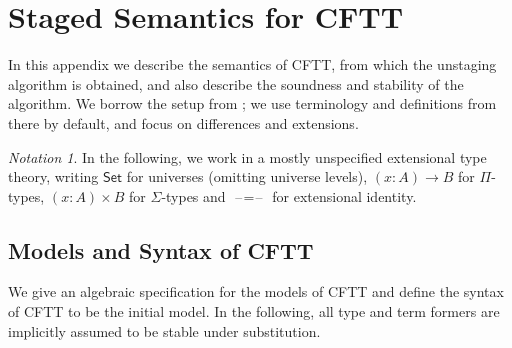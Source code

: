 \documentclass[acmsmall,screen]{acmart}
\newcommand{\msf}[1]{{\mathsf{#1}}}
\newcommand{\Set}{\msf{Set}}
\newcommand{\blank}{{\mathord{\hspace{1pt}\text{--}\hspace{1pt}}}}
\theoremstyle{remark}
\newtheorem{notation}{Notation}
\begin{document}
\newpage

\appendices
\section{Staged Semantics for CFTT}\label{appendix:A}

In this appendix we describe the semantics of CFTT, from which the unstaging
algorithm is obtained, and also describe the soundness and stability of the
algorithm. We borrow the setup from \cite{staged2ltt}; we use terminology and
definitions from there by default, and focus on differences and extensions.

\begin{notation} In the following, we work in a mostly unspecified extensional
type theory, writing $\Set$ for universes (omitting universe levels), $(x : A) \to B$
for $\Pi$-types, $(x : A) \times B$ for $\Sigma$-types and $\blank\!=\!\blank$ for
extensional identity.

\end{notation}

\subsection{Models and Syntax of CFTT}

We give an algebraic \cite{cartmellthesis,DBLP:journals/corr/abs-2302-08837}
specification for the models of CFTT and define the syntax of CFTT to be the
initial model. In the following, all type and term formers are implicitly
assumed to be stable under substitution.
\end{document}
